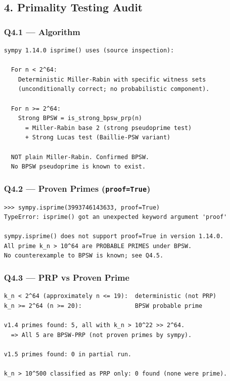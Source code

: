 \documentclass[11pt,a4paper]{article}
\begin{document}
\subsection{4. Primality Testing Audit}

\subsubsection*{Q4.1 --- Algorithm}

\begin{lstlisting}
sympy 1.14.0 isprime() uses (source inspection):

  For n < 2^64:
    Deterministic Miller-Rabin with specific witness sets
    (unconditionally correct; no probabilistic component).

  For n >= 2^64:
    Strong BPSW = is_strong_bpsw_prp(n)
      = Miller-Rabin base 2 (strong pseudoprime test)
      + Strong Lucas test (Baillie-PSW variant)

  NOT plain Miller-Rabin. Confirmed BPSW.
  No BPSW pseudoprime is known to exist.
\end{lstlisting}

\subsubsection*{Q4.2 --- Proven Primes (\texttt{proof=True})}

\begin{lstlisting}
>>> sympy.isprime(3993746143633, proof=True)
TypeError: isprime() got an unexpected keyword argument 'proof'

sympy.isprime() does not support proof=True in version 1.14.0.
All prime k_n > 10^64 are PROBABLE PRIMES under BPSW.
No counterexample to BPSW is known; see Q4.5.
\end{lstlisting}

\subsubsection*{Q4.3 --- PRP vs Proven Prime}

\begin{lstlisting}
k_n < 2^64 (approximately n <= 19):  deterministic (not PRP)
k_n >= 2^64 (n >= 20):               BPSW probable prime

v1.4 primes found: 5, all with k_n > 10^22 >> 2^64.
  => All 5 are BPSW-PRP (not proven primes by sympy).

v1.5 primes found: 0 in partial run.

k_n > 10^500 classified as PRP only: 0 found (none were prime).
\end{lstlisting}
\end{document}
